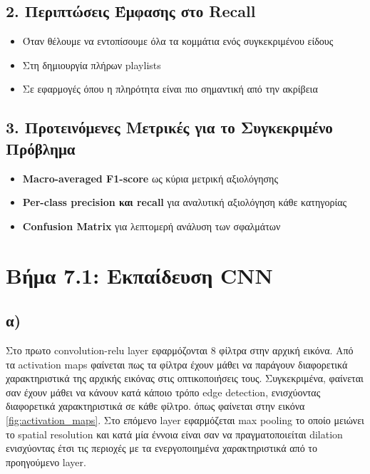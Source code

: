 \documentclass[a4paper,12pt]{article}
\begin{document}
\subsection*{2. Περιπτώσεις Έμφασης στο Recall}
\begin{itemize}
    \item Όταν θέλουμε να εντοπίσουμε όλα τα κομμάτια ενός συγκεκριμένου είδους
    \item Στη δημιουργία πλήρων playlists
    \item Σε εφαρμογές όπου η πληρότητα είναι πιο σημαντική από την ακρίβεια
\end{itemize}

\subsection*{3. Προτεινόμενες Μετρικές για το Συγκεκριμένο Πρόβλημα}
\begin{itemize}
    \item \textbf{Macro-averaged F1-score} ως κύρια μετρική αξιολόγησης
    \item \textbf{Per-class precision και recall} για αναλυτική αξιολόγηση κάθε κατηγορίας
    \item \textbf{Confusion Matrix} για λεπτομερή ανάλυση των σφαλμάτων
\end{itemize}

\section*{Βήμα 7.1: Εκπαίδευση CNN}

\subsection*{α)}

Στο πρωτο convolution-relu layer εφαρμόζονται 8 φίλτρα στην αρχική εικόνα. Από τα activation maps φαίνεται πως τα φίλτρα έχουν μάθει
να παράγουν διαφορετικά χαρακτηριστικά της αρχικής εικόνας στις οπτικοποιήσεις τους. Συγκεκριμένα, φαίνεται σαν έχουν μάθει
να κάνουν κατά κάποιο τρόπο edge detection, ενισχύοντας διαφορετικά χαρακτηριστικά σε κάθε φίλτρο. όπως φαίνεται στην εικόνα \ref{fig:activation_maps}.
Στο επόμενο layer εφαρμόζεται max pooling το οποίο μειώνει το spatial resolution και κατά μία έννοια είναι σαν να πραγματοποιείται
dilation ενισχύοντας έτσι τις περιοχές με τα ενεργοποιημένα χαρακτηριστικά από το προηγούμενο layer.
\end{document}
